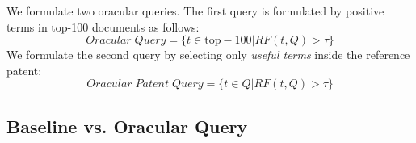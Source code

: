 We formulate two oracular queries. The first query is formulated by positive terms in top-100 documents as follows: 
\begin{equation}
Oracular \; Query = \{t \in \mathrm{top-100}|RF(t, Q)>\tau\}   
 \label{eq:score}
\end{equation}
We formulate the second query by selecting only {\em useful terms} inside the reference patent:
\begin{equation}
 Oracular \; Patent \; Query = \{t\in Q|RF(t, Q)>\tau\}   
 \label{eq:score}
\end{equation}

\subsection{Baseline vs. Oracular Query}

%
%
%
%

